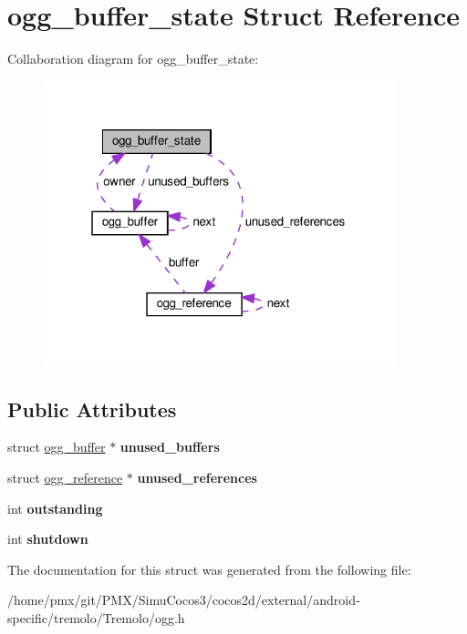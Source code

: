 \hypertarget{structogg__buffer__state}{}\section{ogg\+\_\+buffer\+\_\+state Struct Reference}
\label{structogg__buffer__state}


Collaboration diagram for ogg\+\_\+buffer\+\_\+state\+:
\nopagebreak
\begin{figure}[H]
\begin{center}
\leavevmode
\includegraphics[width=289pt]{structogg__buffer__state__coll__graph}
\end{center}
\end{figure}
\subsection*{Public Attributes}
\begin{DoxyCompactItemize}
\item 
\mbox{\label{structogg__buffer__state_a26fa3525aa91fecd25ad569cb48d6d04}} 
struct \hyperlink{structogg__buffer}{ogg\+\_\+buffer} $\ast$ {\bfseries unused\+\_\+buffers}
\item 
\mbox{\label{structogg__buffer__state_af7c68815c95d859af611488fb80ab580}} 
struct \hyperlink{structogg__reference}{ogg\+\_\+reference} $\ast$ {\bfseries unused\+\_\+references}
\item 
\mbox{\label{structogg__buffer__state_a15f18f672e62706b5962603842418307}} 
int {\bfseries outstanding}
\item 
\mbox{\label{structogg__buffer__state_a3b719fbe24e2384c88e9f61706bd3b82}} 
int {\bfseries shutdown}
\end{DoxyCompactItemize}


The documentation for this struct was generated from the following file\+:\begin{DoxyCompactItemize}
\item 
/home/pmx/git/\+P\+M\+X/\+Simu\+Cocos3/cocos2d/external/android-\/specific/tremolo/\+Tremolo/ogg.\+h\end{DoxyCompactItemize}
